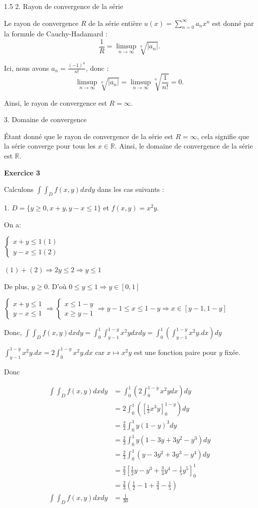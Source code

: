 \documentclass[12pt]{article}
\begin{document}
\begin{spacing}{1.5}
 2. Rayon de convergence de la série

Le rayon de convergence \( R \) de la série entière \( u(x) = \sum_{n=0}^{\infty} a_n x^n \) est donné par la formule de Cauchy-Hadamard :
\[
\frac{1}{R} = \limsup_{n \to \infty} \sqrt[n]{|a_n|}.
\]

Ici, nous avons \( a_n = \frac{(-1)^n}{n!} \), donc :
\[
\limsup_{n \to \infty} \sqrt[n]{|a_n|} = \limsup_{n \to \infty} \sqrt[n]{\frac{1}{n!}} = 0.
\]

Ainsi, le rayon de convergence est \( R = \infty \).

 3. Domaine de convergence

Étant donné que le rayon de convergence de la série est \( R = \infty \), cela signifie que la série converge pour tous les \( x \in \mathbb{R} \). Ainsi, le domaine de convergence de la série est \( \mathbb{R} \).



\medskip
\textbf{Exercice 3}

Calculons $\int\int_{D}f(x,y)dxdy$ dans les cas suivants :

1. $D= \lbrace {y\geq 0, x+y, y-x\leq 1\rbrace}$ et $f(x,y)=x^{2}y$.


On a:

$
\begin{cases}
x+y\leq 1 (1)\\
y-x \leq 1 (2)
\end{cases}$

$(1)+(2)\Longrightarrow 2y\leq 2 \Longrightarrow y\leq 1$

De plus, $y\geq 0$. 	D'où $0\leq y\leq 1\Rightarrow y\in [0,1]$

$
\begin{cases}
x+y\leq 1 \\
y-x \leq 1 
\end{cases}\Rightarrow 
\begin{cases}
x\leq 1-y \\
x \geq y-1
\end{cases}\Longrightarrow  y-1\leq x \leq 1-y \Rightarrow x\in [y-1,1-y]$

Donc,
$
\int\int_{D}f(x,y)dxdy=\int_0^1\int_{y-1}^{1-y}x^2ydxdy=\int_0^1(\int_{y-1}^{1-y}x^2y.dx)dy
$

$\int_{y-1}^{1-y}x^2y.dx=2\int_{0}^{1-y}x^2y.dx$ car $x\mapsto x^2y$ est une fonction paire pour $y$ fixée.

Donc

\begin{align*}
\int\int_{D}f(x,y)dxdy &=\int_0^1(2\int_{0}^{1-y}x^2ydx)dy\\
&=2\int_0^1([\frac{1}{3}x^3y]_0^{1-y})dy\\
&=\frac{2}{3}\int_0^1y(1-y)^3dy\\
&=\frac{2}{3}\int_0^1y(1-3y+3y^2-y^3)dy\\
&=\frac{2}{3}\int_0^1(y-3y^2+3y^3-y^4)dy\\
&=\frac{2}{3}[\frac{1}{2}y-y^3+\frac{3}{4}y^4-\frac{1}{5}y^5]_0^1\\
&=\frac{2}{3}(\frac{1}{2}-1+\frac{3}{4}-\frac{1}{5})\\
\int\int_{D}f(x,y)dxdy &=\frac{1}{30}
\end{align*}


\end{spacing}
\end{document}
